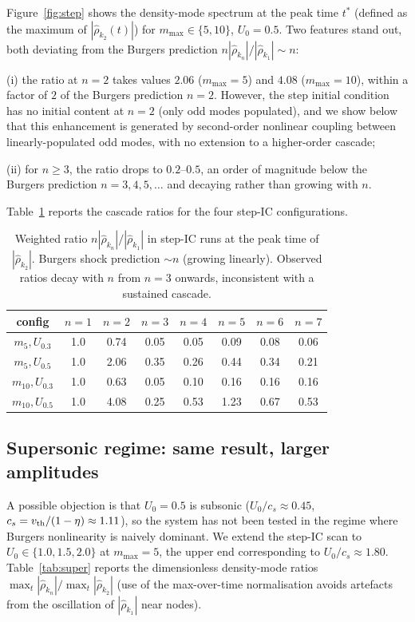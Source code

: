 \documentclass[aps,pre,twocolumn,superscriptaddress,longbibliography,floatfix]{revtex4-2}
\begin{document}
Figure~\ref{fig:step} shows the density-mode spectrum at the
peak time $t^*$ (defined as the maximum of
$|\hat\rho_{k_2}(t)|$) for $m_{\max}\in\{5,10\}$,
$U_0=0.5$. Two features stand out, both deviating from the
Burgers prediction $n|\hat\rho_{k_n}|/|\hat\rho_{k_1}|\sim n$:

\noindent
(i) the ratio at $n=2$ takes values $2.06$ ($m_{\max}=5$) and
$4.08$ ($m_{\max}=10$), within a factor of $2$ of the Burgers
prediction $n=2$. However, the step initial condition has no
initial content at $n=2$ (only odd modes populated), and we
show below that this enhancement is generated by second-order
nonlinear coupling between linearly-populated odd modes, with
no extension to a higher-order cascade;

\noindent
(ii) for $n\ge 3$, the ratio drops to $0.2$--$0.5$, an order
of magnitude below the Burgers prediction $n=3,4,5,\ldots$
and decaying rather than growing with $n$.

Table~\ref{tab:step} reports the cascade ratios for the four
step-IC configurations.

\begin{table}[t]
\centering
\caption{Weighted ratio $n|\hat\rho_{k_n}|/|\hat\rho_{k_1}|$ in
step-IC runs at the peak time of $|\hat\rho_{k_2}|$.
Burgers shock prediction $\sim n$ (growing linearly). Observed
ratios decay with $n$ from $n=3$ onwards, inconsistent with a
sustained cascade.}
\label{tab:step}
\begin{tabular}{cccccccc}
\hline\hline
config & $n=1$ & $n=2$ & $n=3$ & $n=4$ & $n=5$ & $n=6$ & $n=7$\\
\hline
$m_5, U_{0.3}$  & 1.0 & 0.74 & 0.05 & 0.05 & 0.09 & 0.08 & 0.06\\
$m_5, U_{0.5}$  & 1.0 & 2.06 & 0.35 & 0.26 & 0.44 & 0.34 & 0.21\\
$m_{10},U_{0.3}$& 1.0 & 0.63 & 0.05 & 0.10 & 0.16 & 0.16 & 0.16\\
$m_{10},U_{0.5}$& 1.0 & 4.08 & 0.25 & 0.53 & 1.23 & 0.67 & 0.53\\
\hline\hline
\end{tabular}
\end{table}

\subsection{Supersonic regime: same result, larger amplitudes}
\label{sec:supersonic}

A possible objection is that $U_0=0.5$ is subsonic
($U_0/c_s\approx 0.45$, $c_s = v_{\rm th}/(1-\eta)\approx 1.11$),
so the system has not been tested in the regime where Burgers
nonlinearity is naively dominant. We extend the step-IC scan to
$U_0\in\{1.0, 1.5, 2.0\}$ at $m_{\max}=5$, the upper end
corresponding to $U_0/c_s\approx 1.80$.
Table~\ref{tab:super} reports the dimensionless density-mode
ratios $\max_t|\hat\rho_{k_n}|/\max_t|\hat\rho_{k_2}|$ (use of
the max-over-time normalisation avoids artefacts from the
oscillation of $|\hat\rho_{k_1}|$ near nodes).
\end{document}
